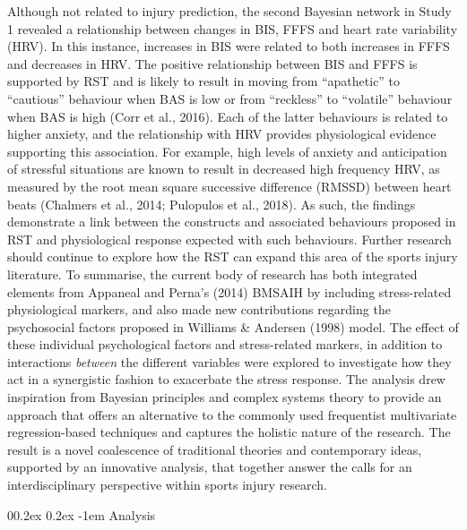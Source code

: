 \documentclass[
  english,
  man,floatsintext]{apa6}
\makeatletter
\renewcommand{\paragraph}{\@startsection{paragraph}{4}{\parindent}%
  {0\baselineskip \@plus 0.2ex \@minus 0.2ex}%
  {-1em}%
  {\normalfont\normalsize\bfseries\itshape\typesectitle}}
\makeatother
\begin{document}
Although not related to injury prediction, the second Bayesian network in Study 1 revealed a relationship between changes in BIS, FFFS and heart rate variability (HRV).
In this instance, increases in BIS were related to both increases in FFFS and decreases in HRV.
The positive relationship between BIS and FFFS is supported by RST and is likely to result in moving from \enquote{apathetic} to \enquote{cautious} behaviour when BAS is low or from \enquote{reckless} to \enquote{volatile} behaviour when BAS is high (Corr et al., 2016).
Each of the latter behaviours is related to higher anxiety, and the relationship with HRV provides physiological evidence supporting this association. For example, high levels of anxiety and anticipation of stressful situations are known to result in decreased high frequency HRV, as measured by the root mean square successive difference (RMSSD) between heart beats (Chalmers et al., 2014; Pulopulos et al., 2018).
As such, the findings demonstrate a link between the constructs and associated behaviours proposed in RST and physiological response expected with such behaviours.
Further research should continue to explore how the RST can expand this area of the sports injury literature.
To summarise, the current body of research has both integrated elements from Appaneal and Perna's (2014) BMSAIH by including stress-related physiological markers, and also made new contributions regarding the psychosocial factors proposed in Williams \& Andersen (1998) model.
The effect of these individual psychological factors and stress-related markers, in addition to interactions \emph{between} the different variables were explored to investigate how they act in a synergistic fashion to exacerbate the stress response.
The analysis drew inspiration from Bayesian principles and complex systems theory to provide an approach that offers an alternative to the commonly used frequentist multivariate regression-based techniques and captures the holistic nature of the research.
The result is a novel coalescence of traditional theories and contemporary ideas, supported by an innovative analysis, that together answer the calls for an interdisciplinary perspective within sports injury research.

\hypertarget{analysis}{%
\paragraph{Analysis}\label{analysis}}
\end{document}
